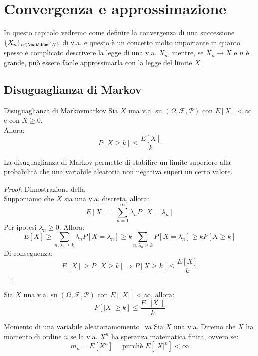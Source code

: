 \documentclass[12pt]{report}
\newcounter{theorem}
\newcounter{corollary}
\newcounter{definition}
\newcommand{\namerefl}[1]{%
	\bgroup
	\let\nmu\MakeLowercase
	\nameref{#1}\egroup}
\newcommand{\nmu}{}
\begin{document}
	 \chapter{Convergenza e approssimazione}
	 In questo capitolo vedremo come definire la convergenza di una successione $\{X_n\}_{n\in\mathbbm{N}}$ di v.a. e questo è un concetto molto importante in quanto spesso è complicato descrivere la legge di una v.a. $X_n$, mentre, se $X_n \longrightarrow X$ e $n$ è grande, può essere facile approssimarla con la legge del limite $X$.
	 \section{Disuguaglianza di Markov}
	 \begin{theorem}{\nmu Disuguaglianza di Markov}{markov}
	 	Sia $X$ una v.a. su $(\Omega, \mathcal{F}, \mathcal{P})$ con $E[X] < \infty$ e con $X \geq 0$. \\
	 	Allora:
	 	\[
	 	P[X \geq k] \leq \dfrac{E[X]}{k}
	 	\]
	 \end{theorem}
	 La disuguaglianza di Markov permette di stabilire un limite superiore alla probabilità che una variabile aleatoria non negativa superi un certo valore.
	 \begin{proof}{Dimostrazione della \namerefl{th:markov}} \quad \\
	 	Supponiamo che $X$ sia una v.a. discreta, allora:
	 	\[
	 	E[X] = \sum_{n=1}^{\infty}\lambda_nP[X = \lambda_n]
	 	\]
	 	Per ipotesi $\lambda_n \geq 0$.
	 	Allora:
	 	\[
	 	E[X] \geq \sum_{n, \lambda_n \geq k}\lambda_nP[X=\lambda_n] \geq k\sum_{n, \lambda_n \geq k} P[X = \lambda_n] \geq kP[X \geq k]
	 	\]
	 	Di conseguenza:
	 	\[
	 	E[X] \geq P[X \geq k] \Rightarrow P[X \geq k] \leq \dfrac{E[X]}{k}
	 	\]
	 \end{proof}
	 \begin{corollary}{}{}
	 	Sia $X$ una v.a. su $(\Omega, \mathcal{F}, \mathcal{P})$ con $E[|X|] < \infty$, allora:
	 	\[
	 	P[|X|\geq k] \leq \dfrac{E[|X|]}{k}
	 	\]
	 \end{corollary}
	 \begin{definition}{\nmu Momento di una variabile aleatoria}{momento_va}
	 	Sia $X$ una v.a. Diremo che $X$ ha momento di ordine $n$ se la v.a. $X^n$ ha speranza matematica finita, ovvero se:
	 	\[
	 	m_n = E[X^n] \quad \text{ purchè } E[|X|^n] < \infty
	 	\]
	 \end{definition}
\end{document}
